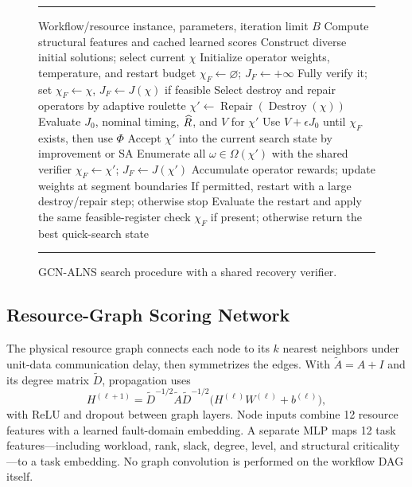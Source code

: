 \begin{figure}[!t]
\centering
\begin{minipage}{\columnwidth}
\hrule\vspace{3pt}
\footnotesize
\begin{algorithmic}[1]
\Require Workflow/resource instance, parameters, iteration limit $B$
\State Compute structural features and cached learned scores
\State Construct diverse initial solutions; select current $\chi$
\State Initialize operator weights, temperature, and restart budget
\State $\chi_F\gets\varnothing$; $J_F\gets+\infty$
  \State Fully verify it; set $\chi_F\gets\chi$, $J_F\gets J(\chi)$ if feasible
\EndIf
{}
  \State Select destroy and repair operators by adaptive roulette
  \State $\chi'\gets\operatorname{Repair}(\operatorname{Destroy}(\chi))$
  \State Evaluate $J_0$, nominal timing, $\widehat{R}$, and $V$ for $\chi'$
  \State Use $V+\epsilon J_0$ until $\chi_F$ exists, then use $\Phi$
  \State Accept $\chi'$ into the current search state by improvement or SA
    \State Enumerate all $\omega\in\Omega(\chi')$ with the shared verifier
      \State $\chi_F\gets\chi'$; $J_F\gets J(\chi')$
    \EndIf
  \EndIf
  \State Accumulate operator rewards; update weights at segment boundaries
    \State If permitted, restart with a large destroy/repair step; otherwise stop
    \State Evaluate the restart and apply the same feasible-register check
  \EndIf
\EndFor
\State \Return $\chi_F$ if present; otherwise return the best quick-search state
\end{algorithmic}
\vspace{3pt}\hrule
\end{minipage}
\caption{GCN-ALNS search procedure with a shared recovery verifier.}
\label{alg:gcnalns}
\end{figure}

\subsection{Resource-Graph Scoring Network}
The physical resource graph connects each node to its $k$ nearest neighbors
under unit-data communication delay, then symmetrizes the edges. With
$\widetilde A=A+I$ and its degree matrix $\widetilde D$, propagation uses
\begin{equation}
 H^{(\ell+1)}=\widetilde D^{-1/2}\widetilde A\widetilde D^{-1/2}
                  \bigl(H^{(\ell)}W^{(\ell)}+b^{(\ell)}\bigr),
 \label{eq:gcn}
\end{equation}
with ReLU and dropout between graph layers. Node inputs combine 12 resource
features with a learned fault-domain embedding. A separate MLP maps 12 task
features---including workload, rank, slack, degree, level, and structural
criticality---to a task embedding. No graph convolution is performed on the
workflow DAG itself.

